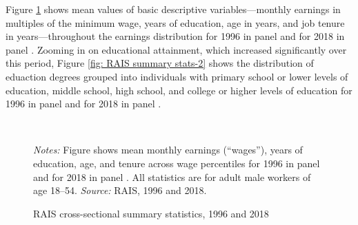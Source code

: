 Figure \ref{fig: RAIS summary stats} shows mean values of basic descriptive
variables---monthly earnings in multiples of the minimum wage, years
of education, age in years, and job tenure in years---throughout
the earnings distribution for 1996 in panel 
and for 2018 in panel . Zooming
in on educational attainment, which increased significantly over this
period, Figure \ref{fig: RAIS summary stats-2} shows the distribution
of eduaction degrees grouped into individuals with primary school
or lower levels of education, middle school, high school, and college
or higher levels of education for 1996 in panel 
and for 2018 in panel .


\begin{figure}[!htb]
  \centering
  \caption{RAIS cross-sectional summary statistics, 1996 and 2018\label{fig: RAIS summary stats}}
  \prefigvspace
  \\
  \postfigvspace
  \begin{minipage}[t]{1\columnwidth}%
    \begin{spacing}{0.75}
      \emph{\scriptsize{}Notes:}{\scriptsize{} Figure shows mean monthly
      earnings (``wages''), years of education, age, and tenure across
      wage percentiles for 1996 in panel 
      and for 2018 in panel . All
      statistics are for adult male workers of age 18--54. %
      \emph{\scriptsize{}Source:} RAIS, 1996 and 2018.}
    \end{spacing}
  \end{minipage}
\end{figure}


